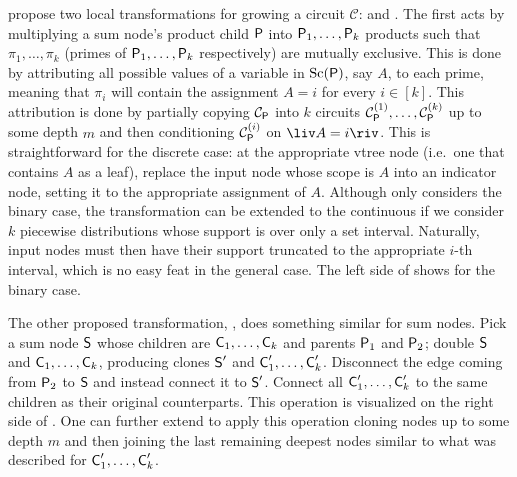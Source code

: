 \citeauthor{liang17} propose two local transformations for growing a circuit $\mathcal{C}$:
 and . The first acts by multiplying a sum node's product child
$\operatorname{\textsf{P}}$ into $\operatorname{\textsf{P}}_1,\ldots,\operatorname{\textsf{P}}_k$ products such that $\pi_1,\ldots,\pi_k$ (primes of
$\operatorname{\textsf{P}}_1,\ldots,\operatorname{\textsf{P}}_k$ respectively) are mutually exclusive. This is done by attributing all
possible values of a variable in $\operatorname*{\normalfont{Sc}}(\operatorname{\textsf{P}})$, say $A$, to each prime, meaning that $\pi_i$ will
contain the assignment $A=i$ for every $i\in\left[k\right]$. This attribution is done by partially
copying $\mathcal{C}_{\operatorname{\textsf{P}}}$ into $k$ circuits $\mathcal{C}_{\operatorname{\textsf{P}}}^{(1)},\ldots,
\mathcal{C}_{\operatorname{\textsf{P}}}^{(k)}$ up to some depth $m$ and then conditioning $\mathcal{C}_{\operatorname{\textsf{P}}}^{(i)}$
on $\liv A=i\riv$. This is straightforward for the discrete case: at the appropriate vtree node
(i.e.\ one that contains $A$ as a leaf), replace the input node whose scope is $A$ into an
indicator node, setting it to the appropriate assignment of $A$. Although \citet{liang17} only
considers the binary case, the transformation can be extended to the continuous if we consider $k$
piecewise distributions whose support is over only a set interval. Naturally, input nodes must then
have their support truncated to the appropriate $i$-th interval, which is no easy feat in the
general case. The left side of  shows  for the binary case.

The other proposed transformation, , does something similar for sum nodes. Pick a
sum node $\operatorname{\textsf{S}}$ whose children are $\operatorname{\textsf{C}}_1,\ldots,\operatorname{\textsf{C}}_k$ and parents $\operatorname{\textsf{P}}_1$ and $\operatorname{\textsf{P}}_2$;
double $\operatorname{\textsf{S}}$ and $\operatorname{\textsf{C}}_1,\ldots,\operatorname{\textsf{C}}_k$, producing clones $\operatorname{\textsf{S}}'$ and $\operatorname{\textsf{C}}_1',\ldots,
\operatorname{\textsf{C}}_k'$. Disconnect the edge coming from $\operatorname{\textsf{P}}_2$ to $\operatorname{\textsf{S}}$ and instead connect it to $\operatorname{\textsf{S}}'$.
Connect all $\operatorname{\textsf{C}}_1',\ldots,\operatorname{\textsf{C}}_k'$ to the same children as their original counterparts. This
operation is visualized on the right side of . One can further extend
 to apply this operation cloning nodes up to some depth $m$ and then joining the
last remaining deepest nodes similar to what was described for $\operatorname{\textsf{C}}_1',\ldots,\operatorname{\textsf{C}}_k'$.

